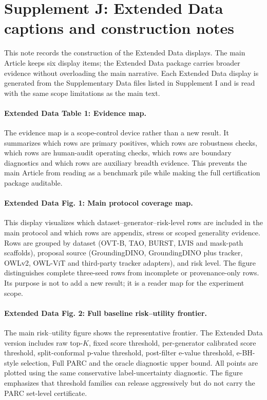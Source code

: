 \documentclass[11pt]{article}
\begin{document}
\clearpage

\section*{Supplement J: Extended Data captions and construction notes}

This note records the construction of the Extended Data displays.
The main Article keeps six display items; the Extended Data package carries broader evidence without overloading the main narrative.
Each Extended Data display is generated from the Supplementary Data files listed in Supplement I and is read with the same scope limitations as the main text.

\paragraph{Extended Data Table 1: Evidence map.}
The evidence map is a scope-control device rather than a new result.
It summarizes which rows are primary positives, which rows are robustness checks, which rows are human-audit operating checks, which rows are boundary diagnostics and which rows are auxiliary breadth evidence.
This prevents the main Article from reading as a benchmark pile while making the full certification package auditable.

\paragraph{Extended Data Fig. 1: Main protocol coverage map.}
This display visualizes which dataset--generator--risk-level rows are included in the main protocol and which rows are appendix, stress or scoped generality evidence.
Rows are grouped by dataset (OVT-B, TAO, BURST, LVIS and mask-path scaffolds), proposal source (GroundingDINO, GroundingDINO plus tracker, OWLv2, OWL-ViT and third-party tracker adapters), and risk level.
The figure distinguishes complete three-seed rows from incomplete or provenance-only rows.
Its purpose is not to add a new result; it is a reader map for the experiment scope.

\paragraph{Extended Data Fig. 2: Full baseline risk--utility frontier.}
The main risk--utility figure shows the representative frontier.
The Extended Data version includes raw top-\(K\), fixed score threshold, per-generator calibrated score threshold, split-conformal p-value threshold, post-filter e-value threshold, e-BH-style selection, Full PARC and the oracle diagnostic upper bound.
All points are plotted using the same conservative label-uncertainty diagnostic.
The figure emphasizes that threshold families can release aggressively but do not carry the PARC set-level certificate.
\end{document}
